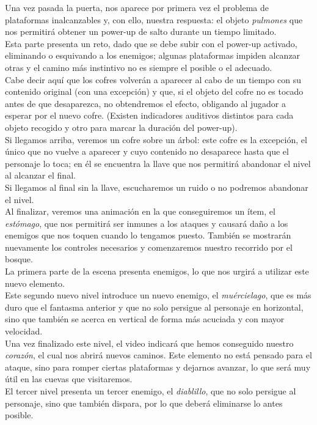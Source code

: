 \documentclass[12pt,a4paper,twoside,spanish]{article}      %
\begin{document}
\begin{itemize}
    Una vez pasada la puerta, nos aparece por primera vez el problema de plataformas inalcanzables y, con ello, nuestra respuesta: el objeto \emph{pulmones} que nos permitirá obtener un power-up de salto durante un tiempo limitado.\\[1mm]
    Esta parte presenta un reto, dado que se debe subir con el power-up activado, eliminando o esquivando a los enemigos; algunas plataformas impiden alcanzar otras y el camino más instintivo no es siempre el posible o el adecuado.\\[1mm]
    Cabe decir aquí que los cofres volverán a aparecer al cabo de un tiempo con su contenido original (con una excepción) y que, si el objeto del cofre no es tocado antes de que desaparezca, no obtendremos el efecto, obligando al jugador a esperar por el nuevo cofre. (Existen indicadores auditivos distintos para cada objeto recogido y otro para marcar la duración del power-up).\\[1mm]
    Si llegamos arriba, veremos un cofre sobre un árbol: este cofre es la excepción, el único que no vuelve a aparecer y cuyo contenido no desaparece hasta que el personaje lo toca; en él se encuentra la llave que nos permitirá abandonar el nivel al alcanzar el final.\\[1mm]
    Si llegamos al final sin la llave, escucharemos un ruido o no podremos abandonar el nivel.\\[1mm]
    Al finalizar, veremos una animación en la que conseguiremos un ítem, el \emph{estómago}, que nos permitirá ser inmunes a los ataques y causará daño a los enemigos que nos toquen cuando lo tengamos puesto. También se mostrarán nuevamente los controles necesarios y comenzaremos nuestro recorrido por el bosque.\\[1mm]
    La primera parte de la escena presenta enemigos, lo que nos urgirá a utilizar este nuevo elemento.\\[1mm]
    Este segundo nuevo nivel introduce un nuevo enemigo, el \emph{muércielago}, que es más duro que el fantasma anterior y que no solo persigue al personaje en horizontal, sino que también se acerca en vertical de forma más acuciada y con mayor velocidad.\\[1mm]
    Una vez finalizado este nivel, el video indicará que hemos conseguido nuestro \emph{corazón}, el cual nos abrirá nuevos caminos. Este elemento no está pensado para el ataque, sino para romper ciertas plataformas y dejarnos avanzar, lo que será muy útil en las cuevas que visitaremos.\\[1mm]
    El tercer nivel presenta un tercer enemigo, el \emph{diablillo}, que no solo persigue al personaje, sino que también dispara, por lo que deberá eliminarse lo antes posible.\\[1mm]

\end{itemize}
\end{document}
